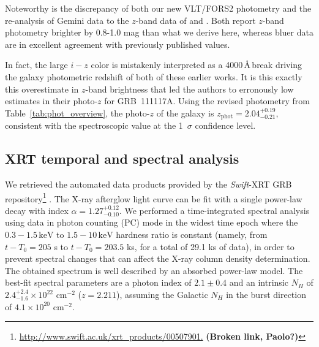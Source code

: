 \documentclass{aa}    %
\newcommand\todo[1]{\textbf{(#1)}}
\begin{document}
Noteworthy is the discrepancy of both our new VLT/FORS2 photometry and the re-analysis of Gemini data to the $z$-band data of \citet{Margutti2012} and \citet{Sakamoto2013}. Both report $z$-band photometry brighter by 0.8-1.0 mag than what we derive here, whereas bluer data are in excellent agreement with previously published values.

In fact, the large $i-z$ color is mistakenly interpreted as a 4000\,\AA\,break driving the galaxy photometric redshift of both of these earlier works. It is this exactly this overestimate in $z$-band brightness that led the authors to erronously low estimates in their photo-$z$ for GRB~111117A. Using the revised photometry from Table~\ref{tab:phot_overview}, the photo-$z$ of the galaxy is $z_{\mathrm{phot}}=2.04_{-0.21}^{+0.19}$, consistent with the spectroscopic value at the 1~$\sigma$ confidence level.






\subsection{XRT temporal and spectral analysis}

We retrieved the automated data products provided by the \textit{Swift}-XRT GRB repository\footnote{\url{http://www.swift.ac.uk/xrt\_products/00507901.} \todo{Broken link, Paolo?}} \citep{Evans2009}. The X-ray afterglow light curve can be fit with a single power-law decay with index $\alpha=1.27_{-0.10}^{+0.12}$. We performed a time-integrated spectral analysis using data in photon counting (PC) mode in the widest time epoch where the $0.3-1.5\,\mathrm{keV}$ to $1.5-10\,\mathrm{keV}$ hardness ratio is constant (namely, from $t-T_0 = 205$ s to $t-T_0 = 203.5$ ks, for a total of 29.1 ks of data), in order to prevent spectral changes that can affect the X-ray column density determination. The obtained spectrum is well described by an absorbed power-law model. The best-fit spectral parameters are a photon index of $2.1 \pm 0.4$ and an intrinsic $N_{H}$ of $2.4_{-1.6}^{+2.4} \times 10^{22}$ cm$^{-2}$ ($z=2.211$), assuming the Galactic $N_{H}$ in the burst direction of $4.1 \times 10^{20}$ cm$^{-2}$.
\end{document}
